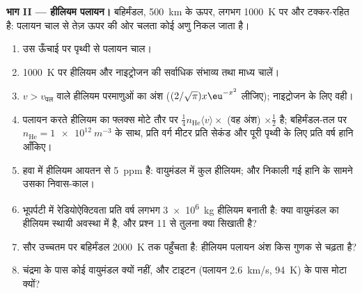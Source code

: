 \begin{problem}
\textbf{भाग II --- हीलियम पलायन।}
बहिर्मंडल, \qty{500}{km} के ऊपर, लगभग \qty{1000}{K} पर और
टक्कर-रहित है: पलायन चाल से तेज़ ऊपर की ओर चलता कोई अणु
निकल जाता है।
\begin{enumerate}[resume]
  \item उस ऊँचाई पर पृथ्वी से पलायन चाल।
  \item \qty{1000}{K} पर हीलियम और नाइट्रोजन की सर्वाधिक संभाव्य तथा माध्य
        चालें।
  \item $v > v_{\text{पल}}$ वाले हीलियम परमाणुओं का अंश
        ($(2/\sqrt\pi)x\eu^{-x^2}$ लीजिए); नाइट्रोजन के लिए वही।
  \item पलायन करते हीलियम का फ्लक्स मोटे तौर पर $\tfrac14n_{\text{He}}\langle
        v\rangle \times$ (वह अंश) $\times\tfrac12$ है; बहिर्मंडल-तल पर $n_{\text{He}}
        = \qty{1e12}{m^{-3}}$ के साथ, प्रति वर्ग मीटर प्रति सेकंड और पूरी पृथ्वी के
        लिए प्रति वर्ष हानि आँकिए।
  \item हवा में हीलियम आयतन से \qty{5}{ppm} है: वायुमंडल में कुल
        हीलियम; और निकाली गई हानि के सामने उसका निवास-काल।
  \item भूपर्पटी में रेडियोऐक्टिवता प्रति वर्ष लगभग \qty{3e6}{kg} हीलियम
        बनाती है: क्या वायुमंडल का हीलियम स्थायी अवस्था में है, और
        प्रश्न 11 से तुलना क्या सिखाती है?
  \item सौर उच्चतम पर बहिर्मंडल \qty{2000}{K} तक पहुँचता है: हीलियम
        पलायन अंश किस गुणक से चढ़ता है?
  \item चंद्रमा के पास कोई वायुमंडल क्यों नहीं, और टाइटन (पलायन
        \qty{2.6}{km/s}, \qty{94}{K}) के पास मोटा क्यों?
\end{enumerate}


\end{problem}
